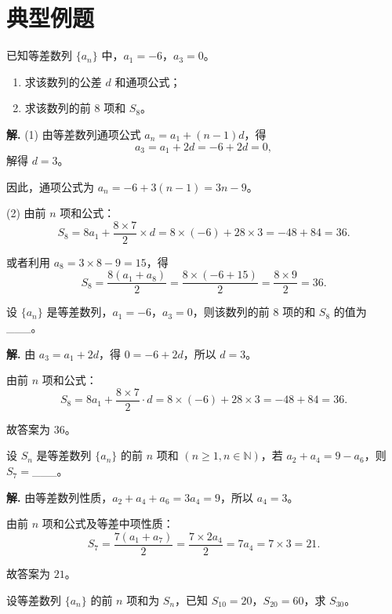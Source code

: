 \documentclass[11pt]{ctexrep}
\begin{document}
\section*{典型例题}

\begin{example}[基本量计算]
    已知等差数列 $\{a_n\}$ 中，$a_1 = -6$，$a_3 = 0$。
    \begin{enumerate}
        \item 求该数列的公差 $d$ 和通项公式；
        \item 求该数列的前 $8$ 项和 $S_8$。
    \end{enumerate}
\end{example}

\textbf{解.} (1) 由等差数列通项公式 $a_n = a_1 + (n-1)d$，得
\[
    a_3 = a_1 + 2d = -6 + 2d = 0,
\]
解得 $d = 3$。

因此，通项公式为 $a_n = -6 + 3(n-1) = 3n - 9$。

(2) 由前 $n$ 项和公式：
\[
    S_8 = 8a_1 + \frac{8 \times 7}{2} \times d = 8 \times (-6) + 28 \times 3 = -48 + 84 = 36.
\]

或者利用 $a_8 = 3 \times 8 - 9 = 15$，得
\[
    S_8 = \frac{8(a_1 + a_8)}{2} = \frac{8 \times (-6 + 15)}{2} = \frac{8 \times 9}{2} = 36.
\]

\begin{realexam}[2025 静安一模]
    设 $\{a_n\}$ 是等差数列，$a_1 = -6$，$a_3 = 0$，则该数列的前 $8$ 项的和 $S_8$ 的值为\_\_\_。
\end{realexam}

\textbf{解.} 由 $a_3 = a_1 + 2d$，得 $0 = -6 + 2d$，所以 $d = 3$。

由前 $n$ 项和公式：
\[
    S_8 = 8a_1 + \frac{8 \times 7}{2} \cdot d = 8 \times (-6) + 28 \times 3 = -48 + 84 = 36.
\]

故答案为 $36$。

\begin{realexam}[2024 普陀一模]
    设 $S_n$ 是等差数列 $\{a_n\}$ 的前 $n$ 项和 $(n \geq 1, n \in \mathbb{N})$，若 $a_2 + a_4 = 9 - a_6$，则 $S_7 =$\_\_\_。
\end{realexam}

\textbf{解.} 由等差数列性质，$a_2 + a_4 + a_6 = 3a_4 = 9$，所以 $a_4 = 3$。

由前 $n$ 项和公式及等差中项性质：
\[
    S_7 = \frac{7(a_1 + a_7)}{2} = \frac{7 \times 2a_4}{2} = 7a_4 = 7 \times 3 = 21.
\]

故答案为 $21$。

\begin{example}[等差数列性质应用]
    设等差数列 $\{a_n\}$ 的前 $n$ 项和为 $S_n$，已知 $S_{10} = 20$，$S_{20} = 60$，求 $S_{30}$。
\end{example}
\end{document}
